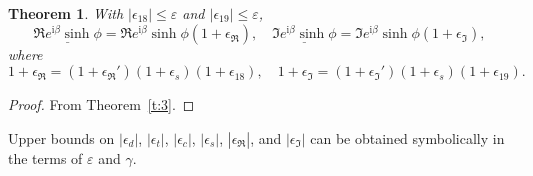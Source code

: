 \documentclass[a4paper,12pt,twoside]{article}
\newtheorem{thm}{Theorem}
\begin{document}
\begin{thm}\label{t:4}
  With $|\epsilon_{18}|\le\varepsilon$ and
  $|\epsilon_{19}|\le\varepsilon$,
  \begin{displaymath}
    \underline{\Re{e^{\mathrm{i}\beta}}\sinh\phi}=\Re{e^{\mathrm{i}\beta}}\sinh\phi(1+\epsilon_{\Re}^{}),\quad
    \underline{\Im{e^{\mathrm{i}\beta}}\sinh\phi}=\Im{e^{\mathrm{i}\beta}}\sinh\phi(1+\epsilon_{\Im}^{}),
  \end{displaymath}
  where
  \begin{equation}
    1+\epsilon_{\Re}^{}=(1+\epsilon_{\Re}')(1+\epsilon_s^{})(1+\epsilon_{18}),\quad
    1+\epsilon_{\Im}^{}=(1+\epsilon_{\Im}')(1+\epsilon_s^{})(1+\epsilon_{19}).
    \label{e:26}
  \end{equation}
\end{thm}
\begin{proof}
  From Theorem~\ref{t:3}.
\end{proof}

Upper bounds on $|\epsilon_d|$, $|\epsilon_t|$, $|\epsilon_c|$,
$|\epsilon_s|$, $|\epsilon_{\Re}|$, and $|\epsilon_{\Im}|$ can be
obtained symbolically in the terms of $\varepsilon$ and $\gamma$.
\end{document}
